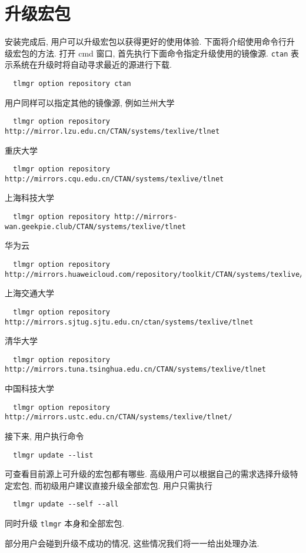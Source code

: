 \documentclass{ctexrep}
\begin{document}
\section{升级宏包}
安装完成后, 用户可以升级宏包以获得更好的使用体验. 
下面将介绍使用命令行升级宏包的方法. 
打开 \textsf{cmd} 窗口, 首先执行下面命令指定升级使用的镜像源. 
\texttt{ctan} 表示系统在升级时将自动寻求最近的源进行下载. 
\begin{lstlisting}
  tlmgr option repository ctan
\end{lstlisting}
用户同样可以指定其他的镜像源, 例如兰州大学
\begin{lstlisting}
  tlmgr option repository http://mirror.lzu.edu.cn/CTAN/systems/texlive/tlnet
\end{lstlisting}
重庆大学
\begin{lstlisting}
  tlmgr option repository http://mirrors.cqu.edu.cn/CTAN/systems/texlive/tlnet
\end{lstlisting}
上海科技大学
\begin{lstlisting}
  tlmgr option repository http://mirrors-wan.geekpie.club/CTAN/systems/texlive/tlnet
\end{lstlisting}
华为云
\begin{lstlisting}
  tlmgr option repository http://mirrors.huaweicloud.com/repository/toolkit/CTAN/systems/texlive/tlnet
\end{lstlisting}
上海交通大学
\begin{lstlisting}
  tlmgr option repository http://mirrors.sjtug.sjtu.edu.cn/ctan/systems/texlive/tlnet
\end{lstlisting}
清华大学
\begin{lstlisting}
  tlmgr option repository http://mirrors.tuna.tsinghua.edu.cn/CTAN/systems/texlive/tlnet
\end{lstlisting}
中国科技大学
\begin{lstlisting}
  tlmgr option repository http://mirrors.ustc.edu.cn/CTAN/systems/texlive/tlnet/
\end{lstlisting}
接下来, 用户执行命令
\begin{lstlisting}
  tlmgr update --list
\end{lstlisting}
可查看目前源上可升级的宏包都有哪些. 
高级用户可以根据自己的需求选择升级特定宏包, 而初级用户建议直接升级全部宏包. 
用户只需执行
\begin{lstlisting}
  tlmgr update --self --all
\end{lstlisting}
同时升级 \texttt{tlmgr} 本身和全部宏包. 

部分用户会碰到升级不成功的情况, 这些情况我们将一一给出处理办法. 
\end{document}
